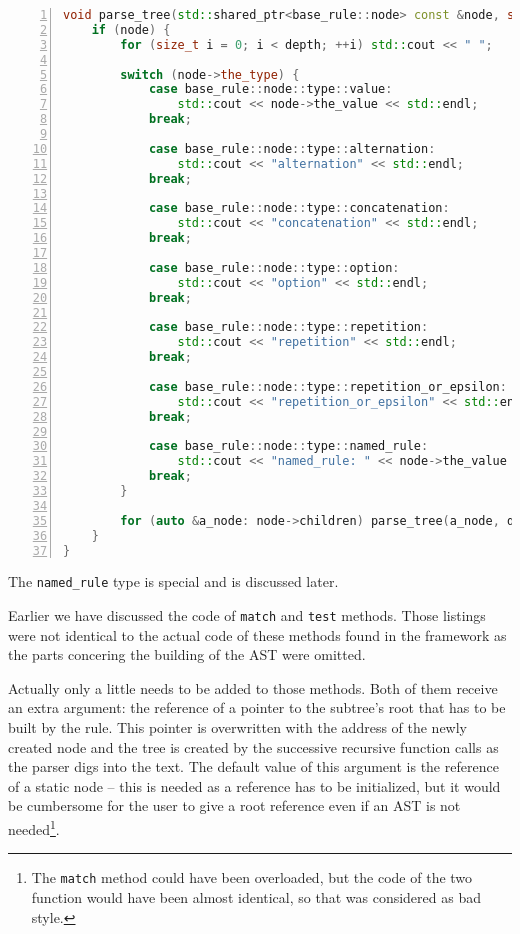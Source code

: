\documentclass[12pt]{article}
\begin{document}
\begin{center}
	\begin{minipage}[h]{0.95\textwidth}
		\begin{lstlisting}[language=C++, breaklines=true, numbers=left]
void parse_tree(std::shared_ptr<base_rule::node> const &node, size_t depth=0) {
	if (node) {
		for (size_t i = 0; i < depth; ++i) std::cout << " ";

		switch (node->the_type) {
			case base_rule::node::type::value:
				std::cout << node->the_value << std::endl;
			break;

			case base_rule::node::type::alternation:
				std::cout << "alternation" << std::endl;
			break;

			case base_rule::node::type::concatenation:
				std::cout << "concatenation" << std::endl;
			break;

			case base_rule::node::type::option:
				std::cout << "option" << std::endl;
			break;

			case base_rule::node::type::repetition:
				std::cout << "repetition" << std::endl;
			break;

			case base_rule::node::type::repetition_or_epsilon:
				std::cout << "repetition_or_epsilon" << std::endl;
			break;

			case base_rule::node::type::named_rule:
				std::cout << "named_rule: " << node->the_value << std::endl;
			break;
		}

		for (auto &a_node: node->children) parse_tree(a_node, depth + 1);
	}
}
		\end{lstlisting}
	\end{minipage}
\end{center}

The \texttt{named\_rule} type is special and is discussed later.

Earlier we have discussed the code of \texttt{match} and \texttt{test} methods. Those listings were not
identical to the actual code of these methods found in the framework as the parts concering the building of
the AST were omitted.

Actually only a little needs to be added to those methods. Both of them receive an extra argument: the
reference of a pointer to the subtree's root that has to be built by the rule. This pointer is overwritten
with the address of the newly created node and the tree is created by the successive recursive function calls
as the parser digs into the text. The default value of this argument is the reference of a static node -- this
is needed as a reference has to be initialized, but it would be cumbersome for the user to give a root
reference even if an AST is not needed\footnote{The \texttt{match} method could have been overloaded, but the
code of the two function would have been almost identical, so that was considered as bad style.}.
\end{document}
